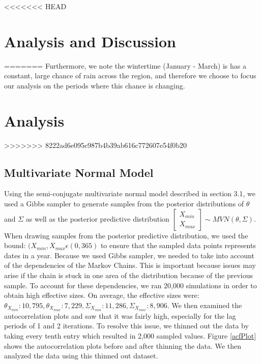 \documentclass{article}
\begin{document}
<<<<<<< HEAD
\section{Analysis and Discussion}
=======
Furthermore, we note the wintertime (January - March) is has a constant, large chance of rain across the region, and therefore we choose to focus our analysis on the periods where this chance is changing.



\section{Analysis}
>>>>>>> 8222ad6e095c987b4b39ab616c772607e54f0b20
\subsection{Multivariate Normal Model}
Using the semi-conjugate multivariate normal model described in section 3.1, we used a Gibbs sampler to generate samples from the posterior distributions of $\theta$ and $\Sigma$ as well as the posterior predictive distribution $\begin{bmatrix} X_{min} \\ X_{max} \end{bmatrix}  \sim MVN(\theta, \Sigma)$. When drawing samples from the posterior predictive distribution, we used the bound: $(X_{min} ,X_{max} \epsilon (0,365)$ to ensure that the sampled data points represents dates in a year. Because we used Gibbs sampler, we needed to take into account of the dependencies of the Markov Chains. This is important because issues may arise if the chain is stuck in one area of the distribution because of the previous sample. To account for these dependencies, we ran 20,000 simulations in order to obtain high effective sizes. On average, the effective sizes were: $\theta_{X_{min}} : 10,795,  \theta_{X_{max}}: 7,229, \Sigma_{X_{min}}: 11,286, \Sigma_{X_{max}}: 8,906$. We then examined the autocorrelation plots and saw that it was fairly high, especially for the lag periods of 1 and 2 iterations. To resolve this issue, we thinned out the data by taking every tenth entry which resulted in 2,000 sampled values. Figure \ref{acfPlot} shows the autocorrelation plots before and after thinning the data. We then analyzed the data using this thinned out dataset.
\end{document}
